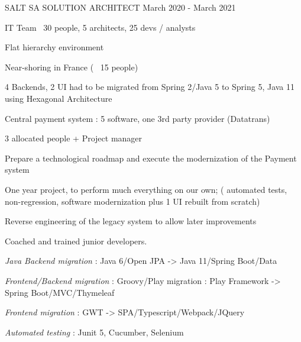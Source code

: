 \begin{cventries}
        \cventry
        {} %
        {} %
        {} %
        {} %
        {
            \globalexperience
            {SALT SA} %
            {SOLUTION ARCHITECT} %
            {March 2020 - March 2021} %
            {
            \begin{cvitems} %
                \item{IT Team ~30 people, 5 architects, 25 devs / analysts}
                \item{Flat hierarchy environment}
                \item{Near-shoring in France ( ~15 people)}
                \item{4 Backends, 2 UI had to be migrated from Spring 2/Java 5 to Spring 5, Java 11 using Hexagonal Architecture}
                \item{Central payment system : 5 software, one 3rd party provider (Datatrans)}
                \item{3 allocated people + Project manager}
            \end{cvitems}
            }
            {
            \begin{cvitems} %
                \item{Prepare a technological roadmap and execute  the modernization of the Payment system}
                \item{One year project, to perform much everything on our own; ( automated tests, non-regression, software modernization plus 1 UI rebuilt from scratch)}
                \item{Reverse engineering of the legacy system to allow later improvements}
                \item{Coached and trained junior developers.}
            \end{cvitems}
            }
            {
            \begin{cvitems} %
                \item{\emph{Java Backend migration} : Java 6/Open JPA -> Java 11/Spring Boot/Data}
                \item{\emph{Frontend/Backend migration} : Groovy/Play migration : Play Framework -> Spring Boot/MVC/Thymeleaf}
                \item{\emph{Frontend migration} : GWT -> SPA/Typescript/Webpack/JQuery}
                \item{\emph{Automated testing} : Junit 5, Cucumber, Selenium}
            \end{cvitems}
            }
        }


\end{cventries}

